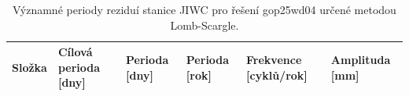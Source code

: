 \begin{table}[htbp]
\caption{Významné periody reziduí stanice JIWC pro řešení gop25wd04 určené metodou Lomb-Scargle.}
\label{tab:gop25wd04_stcd_jiwc_detr_weighted_1seg_spectral_lomb_scargle_significant_periods}
\begin{tabular}{llllll}
\toprule
Složka & Cílová perioda [dny] & Perioda [dny] & Perioda [rok] & Frekvence [cyklů/rok] & Amplituda [mm] \\
\midrule
\bottomrule
\end{tabular}
\end{table}
